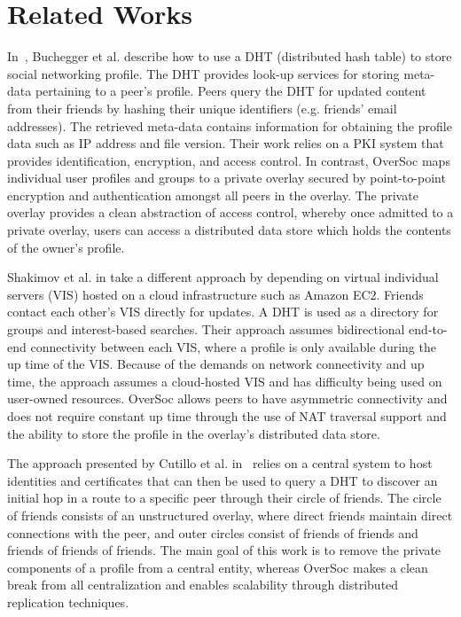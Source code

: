 \section{Related Works}
\label{vpo:background}

In~\cite{peerson}, Buchegger et al. describe how to use a DHT (distributed hash
table) to store social networking profile.  The DHT provides look-up services
for storing meta-data pertaining to a peer's profile.  Peers query the DHT for
updated content from their friends by hashing their unique identifiers (e.g.
friends' email addresses).  The retrieved meta-data contains information for
obtaining the profile data such as IP address and file version. Their work
relies on a PKI system that provides identification, encryption, and access
control.  In contrast, OverSoc maps individual user profiles and groups to a
private overlay secured by point-to-point encryption and authentication amongst
all peers in the overlay.  The private overlay provides a clean abstraction of
access control, whereby once admitted to a private overlay, users can access a
distributed data store which holds the contents of the owner's profile.

Shakimov et al. in \cite{vis-a-vis} take a different approach by depending on
virtual individual servers (VIS) hosted on a cloud infrastructure such as
Amazon EC2. Friends contact each other's VIS directly for updates.  A DHT is
used as a directory for groups and interest-based searches. Their approach
assumes bidirectional end-to-end connectivity between each VIS, where a profile
is only available during the up time of the VIS.  Because of the demands on
network connectivity and up time, the approach assumes a cloud-hosted VIS and
has difficulty being used on user-owned resources.  OverSoc allows peers to
have  asymmetric connectivity and does not require constant up time through the
use of NAT traversal support and the ability to store the profile in the
overlay's distributed data store.

The approach presented by Cutillo et al. in~\cite{matryoshka} relies on a
central system to host identities and certificates that can then be used to
query a DHT to discover an initial hop in a route to a specific peer through
their circle of friends.  The circle of friends consists of an unstructured
overlay, where direct friends maintain direct connections with the peer, and
outer circles consist of friends of friends and friends of friends of friends.
The main goal of this work is to remove the private components of a profile
from a central entity, whereas OverSoc makes a clean break from all
centralization and enables scalability through distributed replication
techniques.

